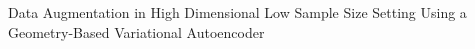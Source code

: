 \documentclass[10pt,journal,compsoc]{IEEEtran}
\begin{document}
% 
%



%
{Data Augmentation in High Dimensional Low Sample Size Setting Using a Geometry-Based Variational Autoencoder}
% 



\end{document}
